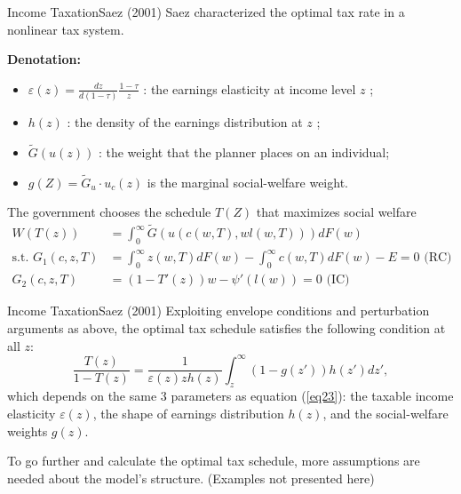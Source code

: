 \documentclass{beamer}
\begin{document}
\begin{frame}{Income Taxation}{Saez (2001)}
	Saez characterized the optimal tax rate in a nonlinear tax system.
	
	\textbf{Denotation:}
	\begin{itemize}
		\item $\varepsilon(z)=\frac{dz}{d(1-\tau)}\frac{1-\tau}{z}$ : the earnings elasticity at income level $z$ ;
		\item $h(z)$ : the density of the earnings distribution at $z$ ;
		\item $\tilde{G}(u(z))$ : the weight that the planner places on an individual;
		\item $g(Z)=\tilde{G}_u\cdot u_c(z)$ is the marginal social-welfare weight.
	\end{itemize}
	\medskip

	The government chooses the schedule $T(Z)$ that maximizes social welfare
	\begin{equation}\nonumber
		\begin{aligned}
			W(T(z)) &= \int_0^\infty\tilde{G}(u(c(w,T),wl(w,T)))dF(w) \\
			\mbox{s.t. }G_1(c,z,T) &= \int_0^\infty z(w,T)dF(w)-\int_0^\infty c(w,T)dF(w)-E=0 \mbox{ (RC)} \\
			G_2(c,z,T) &= (1-T'(z))w-\psi'(l(w))=0 \mbox{ (IC)}
		\end{aligned}
	\end{equation}
\end{frame}
\begin{frame}{Income Taxation}{Saez (2001)}
	Exploiting envelope conditions and perturbation arguments as above, the optimal tax schedule satisfies the following condition at all $z$:
	\begin{equation}
		\frac{T(z)}{1-T(z)} = \frac{1}{\varepsilon(z)zh(z)}\int_z^\infty (1-g(z'))h(z')dz',
	\end{equation}
	which depends on the same 3 parameters as equation (\ref{eq23}): the taxable income elasticity $\varepsilon(z)$, the shape of earnings distribution $h(z)$, and the social-welfare weights $g(z)$.
	\medskip

	To go further and calculate the optimal tax schedule, more assumptions are needed about the model’s structure. (Examples not presented here)
\end{frame}
\end{document}

